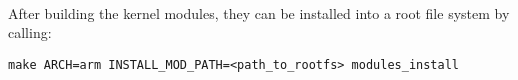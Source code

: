 ~\\
\noindent
After building the kernel modules, they can be installed into a root file system by calling: \\

\begin{lstlisting}[style=text]
make ARCH=arm INSTALL_MOD_PATH=<path_to_rootfs> modules_install
\end{lstlisting}



%
%






